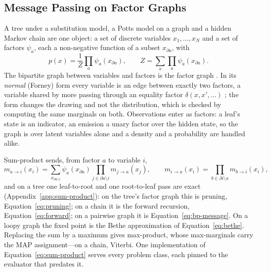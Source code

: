 \documentclass[11pt,a4paper]{article}
\begin{document}
\subsection{Message Passing on Factor Graphs}
\label{sec:factor-graph}

A tree under a substitution model, a Potts model on a graph and a hidden
Markov chain are one object: a set of discrete variables $x_1, \dots, x_N$ and
a set of factors $\psi_a$, each a non-negative function of a subset
$x_{\partial a}$, with
\begin{equation}
  p(x) = \frac{1}{Z} \prod_a \psi_a(x_{\partial a}),
  \qquad
  Z = \sum_x \prod_a \psi_a(x_{\partial a}).
  \label{eq:factor-graph}
\end{equation}
The bipartite graph between variables and factors is the factor graph
\citep{kschischang2001, koller2009}. In its \emph{normal} (Forney) form every
variable is an edge between exactly two factors, a variable shared by more
passing through an equality factor $\delta(x, x', \dots)$ \citep{forney2001};
the form changes the drawing and not the distribution, which is checked by
computing the same marginals on both. Observations enter as factors: a leaf's
state is an indicator, an emission a unary factor over the hidden state, so the
graph is over latent variables alone and a density and a probability are
handled alike.

Sum-product sends, from factor $a$ to variable $i$,
\begin{equation}
  m_{a \to i}(x_i) = \sum_{x_{\partial a \setminus i}}
    \psi_a(x_{\partial a}) \prod_{j \in \partial a \setminus i} m_{j \to a}(x_j),
  \qquad
  m_{i \to a}(x_i) = \prod_{b \in \partial i \setminus a} m_{b \to i}(x_i),
  \label{eq:sum-product}
\end{equation}
and on a tree one leaf-to-root and one root-to-leaf pass are exact
(Appendix~\ref{app:sum-product}): on the tree's factor graph this is pruning, Equation~\ref{eq:pruning}; on a chain it
is the forward recursion, Equation~\ref{eq:forward}; on a pairwise graph it
is Equation~\ref{eq:bp-message}. On a loopy graph the fixed point is the Bethe
approximation of Equation~\ref{eq:bethe}. Replacing the sum by a maximum gives
max-product, whose max-marginals carry the MAP assignment---on a chain,
Viterbi. One implementation of Equation~\ref{eq:sum-product} serves every
problem class, each pinned to the evaluator that predates it.
\end{document}
